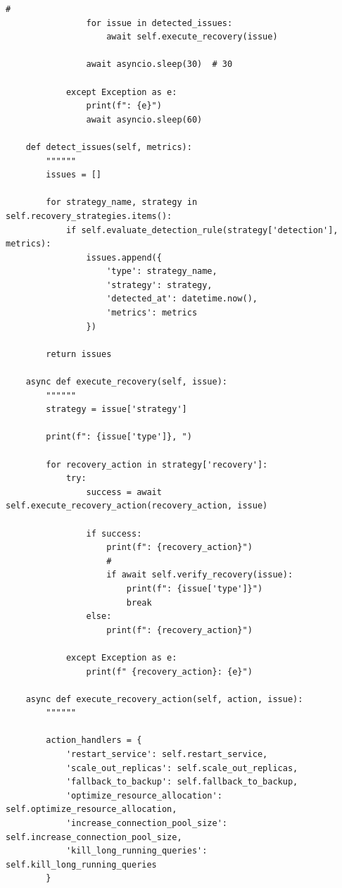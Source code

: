\begin{lstlisting}[style=python]
                # 
                for issue in detected_issues:
                    await self.execute_recovery(issue)
                
                await asyncio.sleep(30)  # 30
                
            except Exception as e:
                print(f": {e}")
                await asyncio.sleep(60)
    
    def detect_issues(self, metrics):
        """"""
        issues = []
        
        for strategy_name, strategy in self.recovery_strategies.items():
            if self.evaluate_detection_rule(strategy['detection'], metrics):
                issues.append({
                    'type': strategy_name,
                    'strategy': strategy,
                    'detected_at': datetime.now(),
                    'metrics': metrics
                })
        
        return issues
    
    async def execute_recovery(self, issue):
        """"""
        strategy = issue['strategy']
        
        print(f": {issue['type']}, ")
        
        for recovery_action in strategy['recovery']:
            try:
                success = await self.execute_recovery_action(recovery_action, issue)
                
                if success:
                    print(f": {recovery_action}")
                    # 
                    if await self.verify_recovery(issue):
                        print(f": {issue['type']}")
                        break
                else:
                    print(f": {recovery_action}")
                    
            except Exception as e:
                print(f" {recovery_action}: {e}")
    
    async def execute_recovery_action(self, action, issue):
        """"""
        
        action_handlers = {
            'restart_service': self.restart_service,
            'scale_out_replicas': self.scale_out_replicas,
            'fallback_to_backup': self.fallback_to_backup,
            'optimize_resource_allocation': self.optimize_resource_allocation,
            'increase_connection_pool_size': self.increase_connection_pool_size,
            'kill_long_running_queries': self.kill_long_running_queries
        }
        

\end{lstlisting}
